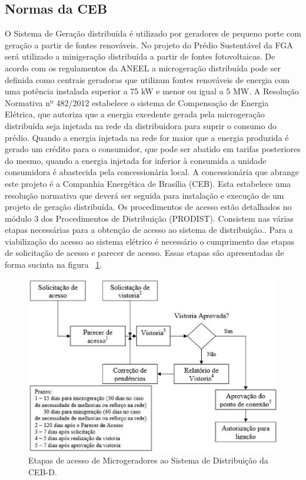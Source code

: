 \subsection{Normas da CEB}

O Sistema de Geração distribuída é utilizado por geradores de pequeno porte com geração a partir de fontes renováveis. No projeto do Prédio Sustentável da FGA será utilizado a minigeração distribuída a partir de fontes fotovoltaicas.
De acordo com os regulamentos da ANEEL a microgeração distribuída pode ser definida como centrais geradoras que utilizam fontes renováveis de energia com uma potência instalada superior a 75 kW e menor ou igual a 5 MW. A Resolução Normativa nº 482/2012 estabelece o sistema de Compensação de Energia Elétrica, que autoriza que a energia excedente gerada pela microgeração distribuída seja injetada na rede da distribuidora para suprir o consumo do prédio. Quando a energia injetada na rede for maior que a energia produzida é gerado um crédito para o consumidor, que pode ser abatido em tarifas posteriores do mesmo, quando a energia injetada for inferior à consumida a unidade consumidora é abastecida pela concessionária local.
A concessionária que abrange este projeto é a Companhia Energética de Brasília (CEB). Esta estabelece uma resolução normativa \cite{ntd609} que deverá ser seguida para instalação e execução de um projeto de geração distribuída.
Os procedimentos de acesso estão detalhados no módulo 3 dos Procedimentos de Distribuição (PRODIST). Consistem nas várias etapas necessárias para a obtenção de acesso ao sistema de distribuição.. Para a viabilização do acesso ao sistema elétrico é necessário o cumprimento das etapas de solicitação de acesso e parecer de acesso. Essas etapas são apresentadas de forma sucinta na figura ~\ref{fig:fluxograma}.

\begin{figure}[!h]
  \centering
  \includegraphics[keepaspectratio=true,scale=0.5]{figuras/fluxograma_smartgrid.eps}
  \caption{Etapas de acesso de Microgeradores ao Sistema de Distribuição da CEB-D.}
  \label{fig:fluxograma}
\end{figure}

